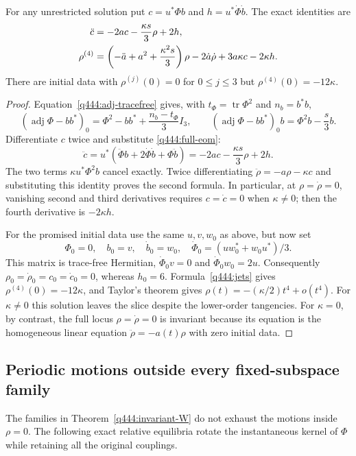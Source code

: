 \begin{proposition}\label{q444:fourth-jet}
For any unrestricted solution put $c=u^*\Phi b$ and
$h=u^*\dot\Phi\dot b$. The exact identities are
\begin{align}\label{q444:jets}
 \ddot c&=-2ac-\frac{\kappa s}{3}\rho+2h,\notag\\
 \rho^{(4)}&=\left(-\ddot a+a^2+\frac{\kappa^2s}{3}\right)\rho
             -2\dot a\dot\rho+3a\kappa c-2\kappa h.
\end{align}
There are initial data with $\rho^{(j)}(0)=0$ for $0\leq j\leq3$
but $\rho^{(4)}(0)=-12\kappa$.
\end{proposition}
\begin{proof}
Equation~\eqref{q444:adj-tracefree} gives, with
$t_\Phi=\operatorname{tr}\Phi^2$ and $n_b=b^*b$,
\[
 (\operatorname{adj}\Phi-bb^*)_0
   =\Phi^2-bb^*+\frac{n_b-t_\Phi}{3}I_3,
 \qquad
 (\operatorname{adj}\Phi-bb^*)_0b=\Phi^2b-\frac{s}{3}b.
\]
Differentiate $c$ twice and substitute \eqref{q444:full-eom}:
\[
 \ddot c=u^*(\ddot\Phi b+2\dot\Phi\dot b+\Phi\ddot b)
         =-2ac-\frac{\kappa s}{3}\rho+2h.
\]
The two terms $\kappa u^*\Phi^2b$ cancel exactly. Twice differentiating
$\ddot\rho=-a\rho-\kappa c$ and substituting this identity proves the
second formula. In particular, at $\rho=\dot\rho=0$, vanishing second
and third derivatives requires $c=\dot c=0$ when $\kappa\ne0$;
then the fourth derivative is $-2\kappa h$.

For the promised initial data use the same $u,v,w_0$ as above, but now set
\[
 \Phi_0=0,\quad b_0=v,\quad\dot b_0=w_0,\quad
 \dot\Phi_0=(uw_0^*+w_0u^*)/3.
\]
This matrix is trace-free Hermitian, $\dot\Phi_0v=0$ and
$\dot\Phi_0w_0=2u$. Consequently
$\rho_0=\dot\rho_0=c_0=\dot c_0=0$, whereas $h_0=6$.
Formula~\eqref{q444:jets} gives $\rho^{(4)}(0)=-12\kappa$, and Taylor's
theorem gives $\rho(t)=-(\kappa/2)t^4+o(t^4)$.
For $\kappa\ne0$ this solution leaves the slice despite the lower-order
tangencies. For $\kappa=0$, by contrast, the full locus
$\rho=\dot\rho=0$ is invariant because its equation is the homogeneous
linear equation $\ddot\rho=-a(t)\rho$ with zero initial data.
\end{proof}

\subsection{Periodic motions outside every fixed-subspace family}

The families in Theorem~\ref{q444:invariant-W} do not exhaust the motions
inside $\rho=0$. The following exact relative equilibria rotate the
instantaneous kernel of $\Phi$ while retaining all the original couplings.

